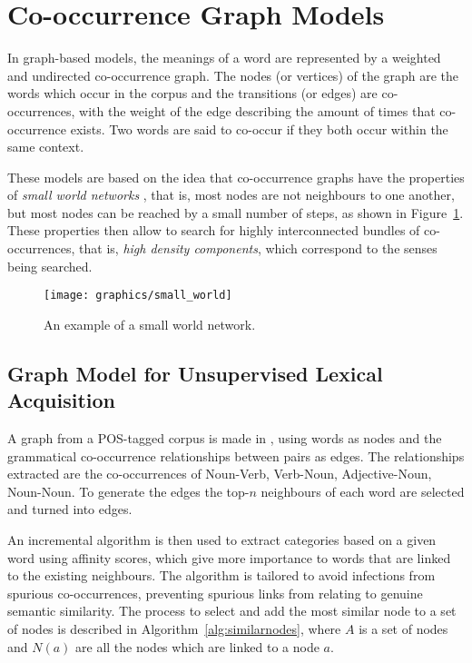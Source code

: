 \section{Co-occurrence Graph Models}
\label{sec:co-occurrence}

In graph-based models, the meanings of a word are represented by a weighted
and undirected co-occurrence graph. The nodes (or vertices) of the graph are the
words which occur in the corpus and the transitions (or edges) are 
co-occurrences, with the weight of the edge describing the amount of times that 
co-occurrence exists. Two words are said to co-occur if they both occur within 
the same context.

These models are based on the idea that co-occurrence graphs have the properties
of \textit{small world networks} \cite{veronis2004hyperlex}, that is, most nodes
are not neighbours to one another, but most nodes can be reached by a small
number of steps, as shown in Figure~\ref{fig:small-world}. These properties
then allow to search for highly interconnected bundles of co-occurrences, that
is, \textit{high density components}, which correspond to the senses being
searched.

\begin{figure}[ht]
 \caption{An example of a small world network.}
 \label{fig:small-world}
 \centering
 \texttt{[image: graphics/small\_world]}
\end{figure}

\subsection{Graph Model for Unsupervised Lexical Acquisition}

A graph from a \ac{POS}-tagged corpus is made in \citep{widdows2002graph}, using
words as nodes and the grammatical co-occurrence relationships between pairs as
edges. The relationships extracted are the co-occurrences of Noun-Verb,
Verb-Noun, Adjective-Noun, Noun-Noun. To generate the edges the top-$n$
neighbours of each word are selected and turned into edges.

An incremental algorithm is then used to extract categories based on a given
word using affinity scores, which give more importance to words that are linked
to the existing neighbours. The algorithm is tailored to avoid infections from
spurious co-occurrences, preventing spurious links from relating to genuine
semantic similarity. The process to select and add the most similar node to a
set of nodes is described in Algorithm~\ref{alg:similarnodes}, where $A$ is a
set of nodes and $N(a)$ are all the nodes which are linked to a node $a$.

